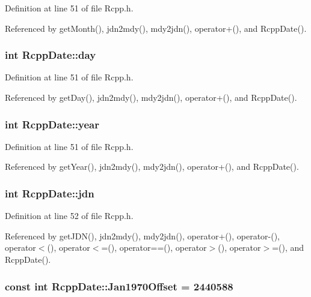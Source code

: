 Definition at line 51 of file Rcpp.h.

Referenced by getMonth(), jdn2mdy(), mdy2jdn(), operator+(), and RcppDate().\hypertarget{classRcppDate_9e6aec176d9432829a304550eadd4205}{
\subsubsection[day]{\setlength{\rightskip}{0pt plus 5cm}int {\bf RcppDate::day}}}
\label{classRcppDate_9e6aec176d9432829a304550eadd4205}




Definition at line 51 of file Rcpp.h.

Referenced by getDay(), jdn2mdy(), mdy2jdn(), operator+(), and RcppDate().\hypertarget{classRcppDate_8881f654ebf42cdf71fdcfce402f0cad}{
\subsubsection[year]{\setlength{\rightskip}{0pt plus 5cm}int {\bf RcppDate::year}}}
\label{classRcppDate_8881f654ebf42cdf71fdcfce402f0cad}




Definition at line 51 of file Rcpp.h.

Referenced by getYear(), jdn2mdy(), mdy2jdn(), operator+(), and RcppDate().\hypertarget{classRcppDate_b883f696379dd06e39c6c9b3502a2164}{
\subsubsection[jdn]{\setlength{\rightskip}{0pt plus 5cm}int {\bf RcppDate::jdn}}}
\label{classRcppDate_b883f696379dd06e39c6c9b3502a2164}




Definition at line 52 of file Rcpp.h.

Referenced by getJDN(), jdn2mdy(), mdy2jdn(), operator+(), operator-(), operator$<$(), operator$<$=(), operator==(), operator$>$(), operator$>$=(), and RcppDate().\hypertarget{classRcppDate_44b0643ab19489a0fb9700d25f504902}{
\subsubsection[Jan1970Offset]{\setlength{\rightskip}{0pt plus 5cm}const int {\bf RcppDate::Jan1970Offset} = 2440588}}
\label{classRcppDate_44b0643ab19489a0fb9700d25f504902}




